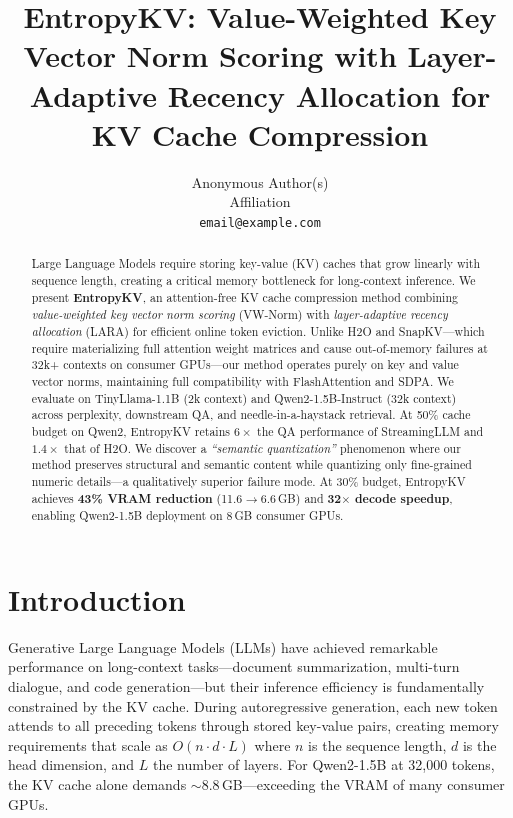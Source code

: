 \documentclass{article}
\title{EntropyKV: Value-Weighted Key Vector Norm Scoring with Layer-Adaptive Recency Allocation for KV Cache Compression}
\author{
  Anonymous Author(s) \\
  Affiliation \\
  \texttt{email@example.com}
}
\begin{document}
\maketitle

\begin{abstract}
Large Language Models require storing key-value (KV) caches that grow linearly with sequence length, creating a critical memory bottleneck for long-context inference. We present \textbf{EntropyKV}, an attention-free KV cache compression method combining \emph{value-weighted key vector norm scoring} (VW-Norm) with \emph{layer-adaptive recency allocation} (LARA) for efficient online token eviction. Unlike H2O and SnapKV---which require materializing full attention weight matrices and cause out-of-memory failures at 32k+ contexts on consumer GPUs---our method operates purely on key and value vector norms, maintaining full compatibility with FlashAttention and SDPA. We evaluate on TinyLlama-1.1B (2k context) and Qwen2-1.5B-Instruct (32k context) across perplexity, downstream QA, and needle-in-a-haystack retrieval. At 50\% cache budget on Qwen2, EntropyKV retains $6\times$ the QA performance of StreamingLLM and $1.4\times$ that of H2O. We discover a \emph{``semantic quantization''} phenomenon where our method preserves structural and semantic content while quantizing only fine-grained numeric details---a qualitatively superior failure mode. At 30\% budget, EntropyKV achieves \textbf{43\% VRAM reduction} (11.6$\rightarrow$6.6\,GB) and \textbf{32$\times$ decode speedup}, enabling Qwen2-1.5B deployment on 8\,GB consumer GPUs.
\end{abstract}

\section{Introduction}

Generative Large Language Models (LLMs) have achieved remarkable performance on long-context tasks---document summarization, multi-turn dialogue, and code generation---but their inference efficiency is fundamentally constrained by the KV cache. During autoregressive generation, each new token attends to all preceding tokens through stored key-value pairs, creating memory requirements that scale as $O(n \cdot d \cdot L)$ where $n$ is the sequence length, $d$ is the head dimension, and $L$ the number of layers. For Qwen2-1.5B at 32,000 tokens, the KV cache alone demands $\sim$8.8\,GB---exceeding the VRAM of many consumer GPUs.
\end{document}
